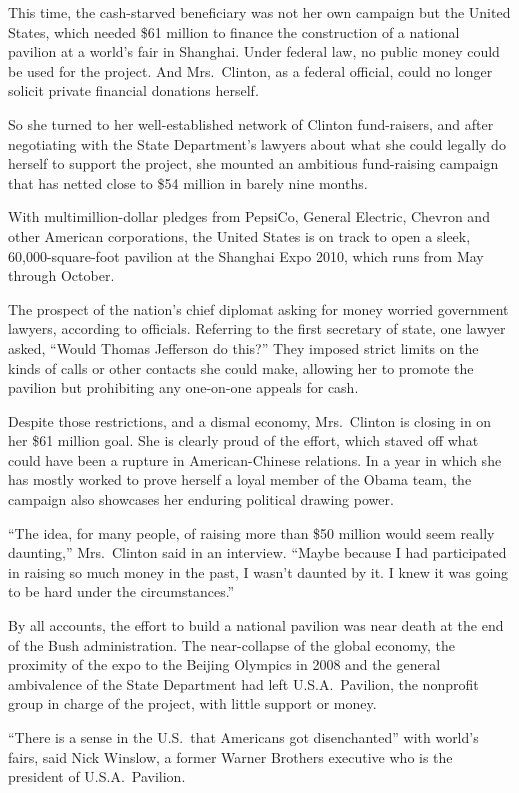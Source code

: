 ﻿\documentclass[12pt]{article}
\begin{document}
This time, the cash-starved beneficiary was not her own campaign but the United States, which needed
\$61 million to finance the construction of a national pavilion at a world's fair in Shanghai. Under
federal law, no public money could be used for the project. And Mrs.~Clinton, as a federal official,
could no longer solicit private financial donations herself.

So she turned to her well-established network of Clinton fund-raisers, and after negotiating with
the State Department's lawyers about what she could legally do herself to support the project, she
mounted an ambitious fund-raising campaign that has netted close to \$54 million in barely nine
months.

With multimillion-dollar pledges from PepsiCo, General Electric, Chevron and other American
corporations, the United States is on track to open a sleek, 60,000-square-foot pavilion at the
Shanghai Expo 2010, which runs from May through October.

The prospect of the nation's chief diplomat asking for money worried government lawyers, according
to officials. Referring to the first secretary of state, one lawyer asked, ``Would Thomas Jefferson
do this?'' They imposed strict limits on the kinds of calls or other contacts she could make,
allowing her to promote the pavilion but prohibiting any one-on-one appeals for cash.

Despite those restrictions, and a dismal economy, Mrs.~Clinton is closing in on her \$61 million
goal. She is clearly proud of the effort, which staved off what could have been a rupture in
American-Chinese relations. In a year in which she has mostly worked to prove herself a loyal member
of the Obama team, the campaign also showcases her enduring political drawing power.

``The idea, for many people, of raising more than \$50 million would seem really daunting,''
Mrs.~Clinton said in an interview. ``Maybe because I had participated in raising so much money in
the past, I wasn't daunted by it. I knew it was going to be hard under the circumstances.''

By all accounts, the effort to build a national pavilion was near death at the end of the Bush
administration. The near-collapse of the global economy, the proximity of the expo to the Beijing
Olympics in 2008 and the general ambivalence of the State Department had left U.S.A.~Pavilion, the
nonprofit group in charge of the project, with little support or money.

``There is a sense in the U.S.~that Americans got disenchanted'' with world's fairs, said Nick
Winslow, a former Warner Brothers executive who is the president of U.S.A.~Pavilion.
\end{document}
